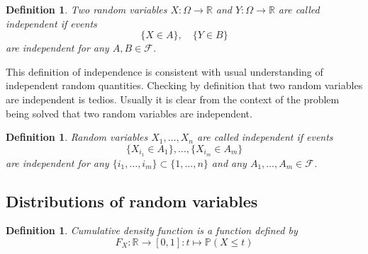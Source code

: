 \documentclass[12pt]{article}
\newtheorem{definition}[theorem]{Definition}
\begin{document}
\begin{definition} Two random variables $X:\Omega\to\mathbb{R}$ and
    $Y:\Omega\to\mathbb{R}$ are called independent if events
    $$
        \{X\in A\},\quad \{Y\in B\}
    $$
    are independent for any $A,B\in\mathcal{F}$.
\end{definition}

This definition of independence is consistent with usual understanding of
independent random quantities. Checking by definition that two random variables
are independent is tedios. Usually it is clear from the context of the problem
being solved that two random variables are independent.

\begin{definition} Random variables $X_1,\ldots,X_n$ are called independent if
    events
    $$
        \{X_{i_1}\in A_1\},\ldots,\{X_{i_m}\in  A_m\}
    $$
    are independent for any $\{i_1,\ldots,i_m\}\subset \{1,\ldots,n\}$ and any
    $A_1,\ldots,A_m\in\mathcal{F}$.
\end{definition}


\subsection{Distributions of random variables}

\begin{definition} Cumulative density function is a function defined by
    $$
        F_X:\mathbb{R}\to [0,1]: t\mapsto \mathbb{P}(X\leq t)
    $$
\end{definition}
\end{document}
